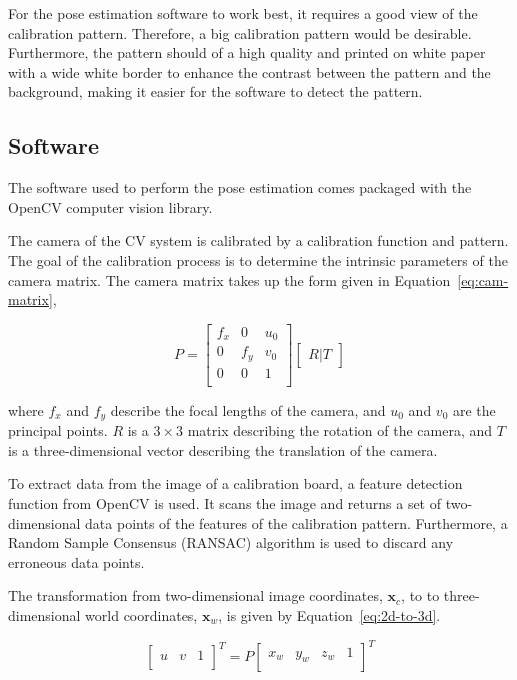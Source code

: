 For the pose estimation software to work best, it requires a good view of the calibration pattern. Therefore, a big calibration pattern would be desirable. Furthermore, the pattern should of a high quality and printed on white paper with a wide white border to enhance the contrast between the pattern and the background, making it easier for the software to detect the pattern. 

\subsection{Software}
\label{sec:cv-sys-software}

The software used to perform the pose estimation comes packaged with the OpenCV computer vision library. 

The camera of the CV system is calibrated by a calibration function and pattern. The goal of the calibration process is to determine the intrinsic parameters of the camera matrix. The camera matrix takes up the form given in Equation~\ref{eq:cam-matrix},

\begin{equation}
  \label{eq:cam-matrix}
  P = 
  \begin{bmatrix}
    f_x & 0   & u_0 \\
    0   & f_y & v_0 \\
    0   & 0   & 1   \\
  \end{bmatrix}
  \begin{bmatrix}
    R | T
  \end{bmatrix}
\end{equation}

where $f_x$ and $f_y$ describe the focal lengths of the camera, and $u_0$ and $v_0$ are the principal points. $R$ is a $3\times3$ matrix describing the rotation of the camera, and $T$ is a three-dimensional vector describing the translation of the camera. 

To extract data from the image of a calibration board, a feature detection function from OpenCV is used. It scans the image and returns a set of two-dimensional data points of the features of the calibration pattern. Furthermore, a Random Sample Consensus (RANSAC) algorithm is used to discard any erroneous data points.

The transformation from two-dimensional image coordinates, $\bm{x}_c$, to to three-dimensional world coordinates, $\bm{x}_w$, is given by Equation~\ref{eq:2d-to-3d}.

\begin{equation}
   \label{eq:2d-to-3d}
   \begin{bmatrix}
     u & v & 1 \\
   \end{bmatrix}^T
   = P
   \begin{bmatrix}
     x_w & y_w & z_w & 1 \\
   \end{bmatrix}^T
 \end{equation}

